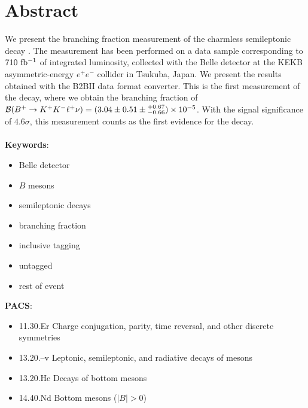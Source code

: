 \pagestyle{empty}

\cleardoublepage
\pagestyle{plain}
\chapter*{Abstract}
We present the branching fraction measurement of the charmless semileptonic decay \decayb. The measurement has been performed on a data sample corresponding to $710\mathrm{~fb^{-1}}$ of integrated luminosity, collected with the Belle detector at the KEKB asymmetric-energy $e^+e^-$ collider in Tsukuba, Japan. We present the results obtained with the B2BII data format converter. This is the first measurement of the decay, where we obtain the branching fraction of $\mathcal{B}(B^+ \to K^+ K^- \ell^+ \nu) = (3.04 \pm 0.51 \pm {}^{+0.67}_{-0.66})\times 10^{-5}$. With the signal significance of $4.6\sigma$, this measurement counts as the first evidence for the decay.\\
\vspace{1cm}\\
{{\bf Keywords}:} 
\begin{itemize}
	\item Belle detector
	\item $B$ mesons
	\item semileptonic decays
	\item branching fraction
	\item inclusive tagging
	\item untagged
	\item rest of event
\end{itemize}
\vspace{1cm}
{{\bf PACS}:}
\begin{itemize}
	\item 11.30.Er Charge conjugation, parity, time reversal, and other discrete symmetries
	\item 13.20.--v Leptonic, semileptonic, and radiative decays of mesons
	\item 13.20.He Decays of bottom mesons 
	\item 14.40.Nd Bottom mesons ($|B|>0$) 
\end{itemize}

\pagestyle{empty}

\tableofcontents
\pagestyle{plain}
